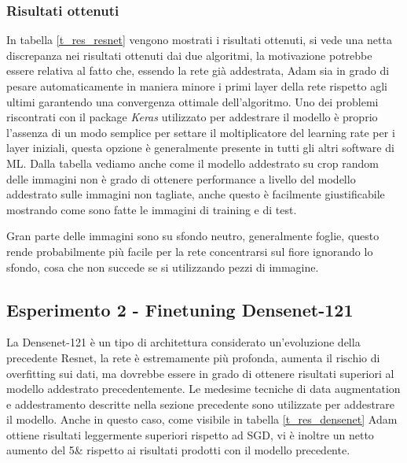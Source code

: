 \subsubsection{Risultati ottenuti}
In tabella \ref{t_res_resnet} vengono mostrati i risultati ottenuti, si vede una netta discrepanza nei risultati ottenuti dai due algoritmi, la motivazione potrebbe essere relativa al fatto che, essendo la rete già addestrata, Adam sia in grado di pesare automaticamente in maniera minore i primi layer della rete rispetto agli ultimi garantendo una convergenza ottimale dell'algoritmo.
Uno dei problemi riscontrati con il package \textit{Keras} utilizzato per addestrare il modello è proprio l'assenza di un modo semplice per settare il moltiplicatore del learning rate per i layer iniziali, questa opzione è generalmente presente in tutti gli altri software di ML. Dalla tabella vediamo anche come il modello addestrato su crop random delle immagini non è grado di ottenere performance a livello del modello addestrato sulle immagini non tagliate, anche questo è facilmente giustificabile mostrando come sono fatte le immagini di training e di test.

Gran parte delle immagini sono su sfondo neutro, generalmente foglie, questo rende probabilmente più facile per la rete concentrarsi sul fiore ignorando lo sfondo, cosa che non succede se si utilizzando pezzi di immagine.
\subsection{Esperimento 2 - Finetuning Densenet-121}
La Densenet-121 \cite{huang2016densely} è un tipo di architettura considerato un'evoluzione della precedente Resnet, la rete è estremamente più profonda, aumenta il rischio di overfitting sui dati, ma dovrebbe essere in grado di ottenere risultati superiori al modello addestrato precedentemente. Le medesime tecniche di data augmentation e addestramento descritte nella sezione precedente sono utilizzate per addestrare il modello.
Anche in questo caso, come visibile in tabella \ref{t_res_densenet} Adam ottiene risultati leggermente superiori rispetto ad SGD, vi è inoltre un netto aumento del 5\& rispetto ai risultati prodotti con il modello precedente.
